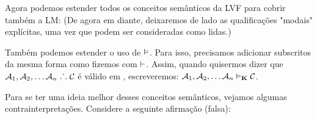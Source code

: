 Agora podemos estender todos os conceitos semânticos da  LVF para cobrir também a LM:
(De agora em diante, deixaremos de lado as qualificações "modais"  explícitas, uma vez que podem ser consideradas como lidas.)


Também podemos estender o uso de $\vDash$. Para isso, precisamos adicionar subscritos da mesma forma como fizemos com $\vdash$. Assim, quando quisermos dizer que $\mathcal{A}_1,\mathcal{A}_2, \dots \mathcal{A}_n\mathrel{\ldotp\dot{}\,\ldotp}\mathcal{C}$  é válido em \mlK, escreveremos: $\mathcal{A}_1,\mathcal{A}_2, \dots \mathcal{A}_n\vDash_{\mathbf{K}}\mathcal{C}$. 

Para se ter uma ideia melhor desses conceitos semânticos, vejamos algumas contrainterpretações. Considere a seguinte afirmação (falsa):

